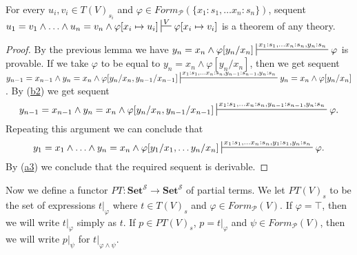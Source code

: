 \documentclass[reqno]{amsart}
\newcommand{\axref}[1]{(\hyperref[ax:#1]{#1})}
\theoremstyle{definition}
\theoremstyle{remark}
\newcommand{\cat}[1]{\mathbf{#1}}
\newcommand{\Set}{\cat{Set}}
\numberwithin{figure}{section}
\begin{document}
\begin{lem}[cong-b]
For every $u_i,v_i \in T(V)_{s_i}$ and $\varphi \in Form_\mathcal{P}(\{ x_1 : s_1, \ldots x_n : s_n\})$,
sequent $u_1 = v_1 \land \ldots \land u_n = v_n \land \varphi[x_i \mapsto u_i] \sststile{}{V} \varphi[x_i \mapsto v_i]$ is a theorem of any theory.
\end{lem}
\begin{proof}
By the previous lemma we have $y_n = x_n \land \varphi[y_n/x_n] \sststile{}{x_1 : s_1, \ldots x_n : s_n, y_n : s_n} \varphi$ is provable.
If we take $\varphi$ to be equal to $y_n = x_n \land \varphi[y_n/x_n]$, then we get sequent
$y_{n-1} = x_{n-1} \land y_n = x_n \land \varphi[y_n/x_n,y_{n-1}/x_{n-1}] \sststile{}{x_1 : s_1, \ldots x_n : s_n, y_{n-1} : s_{n-1}, y_n : s_n} y_n = x_n \land \varphi[y_n/x_n]$.
By \axref{b2} we get sequent
\[ y_{n-1} = x_{n-1} \land y_n = x_n \land \varphi[y_n/x_n,y_{n-1}/x_{n-1}] \sststile{}{x_1 : s_1, \ldots x_n : s_n, y_{n-1} : s_{n-1}, y_n : s_n} \varphi. \]
Repeating this argument we can conclude that
\[ y_1 = x_1 \land \ldots \land y_n = x_n \land \varphi[y_1/x_1, \ldots y_n/x_n] \sststile{}{x_1 : s_1, \ldots x_n : s_n, y_1 : s_1, y_n : s_n} \varphi. \]
By \axref{a3} we conclude that the required sequent is derivable.
\end{proof}

Now we define a functor $PT : \Set^\mathcal{S} \to \Set^\mathcal{S}$ of partial terms.
We let $PT(V)_s$ to be the set of expressions $t|_\varphi$ where $t \in T(V)_s$ and $\varphi \in Form_\mathcal{P}(V)$.
If $\varphi = \top$, then we will write $t|_\varphi$ simply as $t$.
If $p \in PT(V)_s$, $p = t|_\varphi$ and $\psi \in Form_\mathcal{P}(V)$, then we will write $p|_\psi$ for $t|_{\varphi \land \psi}$.
\end{document}
